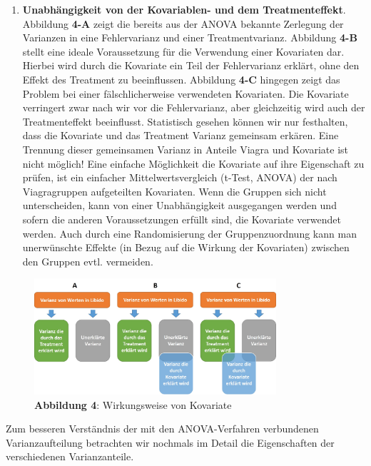 \documentclass[]{article}
\providecommand{\tightlist}{%
  \setlength{\itemsep}{0pt}\setlength{\parskip}{0pt}}
\begin{document}
\begin{enumerate}
\def\labelenumi{\arabic{enumi}.}
\tightlist
\item
  \textbf{Unabhängigkeit von der Kovariablen- und dem Treatmenteffekt}.
  Abbildung \textbf{4-A} zeigt die bereits aus der ANOVA bekannte
  Zerlegung der Varianzen in eine Fehlervarianz und einer
  Treatmentvarianz. Abbildung \textbf{4-B} stellt eine ideale
  Voraussetzung für die Verwendung einer Kovariaten dar. Hierbei wird
  durch die Kovariate ein Teil der Fehlervarianz erklärt, ohne den
  Effekt des Treatment zu beeinflussen. Abbildung \textbf{4-C} hingegen
  zeigt das Problem bei einer fälschlicherweise verwendeten Kovariaten.
  Die Kovariate verringert zwar nach wir vor die Fehlervarianz, aber
  gleichzeitig wird auch der Treatmenteffekt beeinflusst. Statistisch
  gesehen können wir nur festhalten, dass die Kovariate und das
  Treatment Varianz gemeinsam erkären. Eine Trennung dieser gemeinsamen
  Varianz in Anteile Viagra und Kovariate ist nicht möglich! Eine
  einfache Möglichkeit die Kovariate auf ihre Eigenschaft zu prüfen, ist
  ein einfacher Mittelwertsvergleich (t-Test, ANOVA) der nach
  Viagragruppen aufgeteilten Kovariaten. Wenn die Gruppen sich nicht
  unterscheiden, kann von einer Unabhängigkeit ausgegangen werden und
  sofern die anderen Voraussetzungen erfüllt sind, die Kovariate
  verwendet werden. Auch durch eine Randomisierung der Gruppenzuordnung
  kann man unerwünschte Effekte (in Bezug auf die Wirkung der
  Kovariaten) zwischen den Gruppen evtl. vermeiden.
\end{enumerate}

\begin{figure}
\centering
\includegraphics[width=0.80000\textwidth]{Images/Kovarianz_Field_11_2.jpg}
\caption{\textbf{Abbildung 4}: Wirkungsweise von Kovariate}
\end{figure}

Zum besseren Verständnis der mit den ANOVA-Verfahren verbundenen
Varianzaufteilung betrachten wir nochmals im Detail die Eigenschaften
der verschiedenen Varianzanteile.
\end{document}
